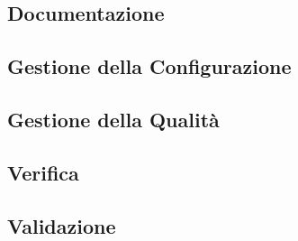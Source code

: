 \subsection{Documentazione}
\subsection{Gestione della Configurazione}
\subsection{Gestione della Qualità}
\subsection{Verifica}
\subsection{Validazione}